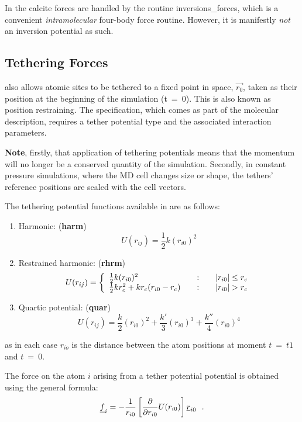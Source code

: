 In \D the calcite forces are handled by the routine
{\sc inversions\_forces}, which is a convenient {\em intramolecular} four-body
force routine. However, it is manifestly {\em not} an inversion potential as such.

\subsection{Tethering Forces}

\D also allows atomic sites to be tethered
to a fixed point in space, $\vec{r_{0}}$, taken as their position
at the beginning of the simulation (t~=~0).  This is also known as
position restraining.  The specification, which comes as part of
the molecular description, requires a tether potential type and
the associated interaction parameters.

{\bf Note}, firstly, that application of tethering potentials means that
the momentum will no longer be a conserved quantity of the
simulation.  Secondly, in constant pressure simulations, where the
MD cell changes size or shape, the tethers' reference positions
are scaled with the cell vectors.

The tethering potential functions available in \D are as follows:
\begin{enumerate}
\item Harmonic:  ({\bf harm})
\begin{equation}
U(r_{ij}) = \frac{1}{2}k(r_{i0})^{2}
\end{equation}
\item Restrained harmonic:  ({\bf rhrm})
\begin{equation}
U(r_{ij}) = \left\{ \begin{array} {l@{\qquad:\qquad}l}
\frac{1}{2}k(r_{i0})^{2} & |r_{i0}| \le r_{c} \\
\frac{1}{2}kr_{c}^{2} + kr_{c}(r_{i0}-r_{c}) & |r_{i0}| > r_{c}
\end{array} \right.
\end{equation}
\item Quartic potential:  ({\bf quar})
\begin{equation}
U(r_{ij}) =
\frac{k}{2}(r_{i0})^{2}+\frac{k'}{3}(r_{i0})^{3}+\frac{k''}{4}(r_{i0})^{4}
\end{equation}
\end{enumerate}
as in each case $r_{io}$ is the distance between the atom
positions at moment $t~=~t1$ and $t~=~0$.

The force on the atom $i$ arising from a tether potential
potential is obtained using the general
formula:
\begin{equation}
\mbox{$\underline{f}$}_{i} = -\frac{1}{{r}_{i0}}\left[ \frac{\partial }{\partial
r_{i0}}U(r_{i0})\right]\mbox{$\underline{r}$}_{i0}~~.
\end{equation}

